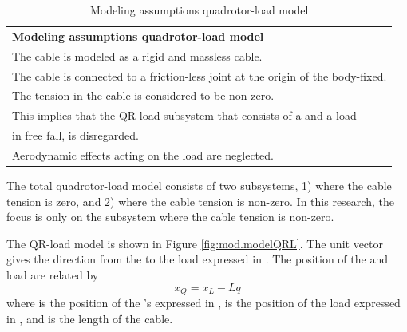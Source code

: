 \begin{table}[h!]
	\centering
	\begin{tabular}{|p{\textwidth}|}
		\hline 		\vspace{0.1mm}
		\textbf{Modeling assumptions quadrotor-load model}\\ 	\vspace{0.1mm}		
		\tabitem The cable is modeled as a rigid and massless cable. \\
		\tabitem The cable is connected to a friction-less joint at the origin of the body-fixed. \\
		\tabitem The tension in the cable is considered to be non-zero.\\
		\hspace{4mm} This implies that the QR-load subsystem that consists of a \a{qr} and a load\\
		\hspace{4mm} in free fall, is disregarded.\\		 
		\tabitem Aerodynamic effects acting on the load are neglected.\\
		\hline
	\end{tabular}
	\caption{Modeling assumptions quadrotor-load model}
	\label{tab:mod.assumptionsQRL}
\end{table}
The total quadrotor-load model consists of two subsystems, 1) where the cable tension is zero, and 2) where the cable tension is non-zero.
In this research, the focus is only on the subsystem where the cable tension is non-zero.

The QR-load model is shown in Figure \ref{fig:mod.modelQRL}. The unit vector  gives the direction from the  to the load expressed in \BF. The position of the  and load are related by
\begin{equation}\label{eq:mod.xQ2xL}
x_Q=x_L-Lq
\end{equation}
where  is the position of the 's  expressed in \IF,  is the position of the load expressed in \IF, and  is the length of the cable.

